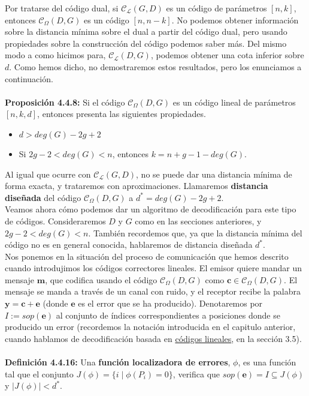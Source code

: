 \documentclass[11pt,spanish]{book}
\begin{document}
Por tratarse del código dual, si $\mathcal{C}_{\mathcal{L}}(G,D)$ es un código de parámetros $[n,k]$, entonces $\mathcal{C}_{\Omega}(D,G)$ es un código $[n, n-k]$. No podemos obtener información sobre la distancia mínima sobre el dual a partir del código dual, pero usando propiedades sobre la construcción del código podemos saber más. Del mismo modo a como hicimos para, $\mathcal{C}_{\mathcal{L}}(D,G)$, podemos obtener una cota inferior sobre $d$. Como hemos dicho, no demostraremos estos resultados, pero los enunciamos a continuación.\\
\\ \hypertarget{prop4.4.8}{\textbf{Proposición 4.4.8:}} Si el código $\mathcal{C}_{\Omega}(D,G)$ es un código lineal de parámetros $[n,k,d]$, entonces presenta las siguientes propiedades.
\begin{itemize}
    \item $d>deg(G)-2g+2$
    \item Si $2g-2<deg(G)<n$, entonces $k=n+g-1-deg(G)$.
\end{itemize}

Al igual que ocurre con $\mathcal{C}_{\mathcal{L}}(G,D)$, no se puede dar una distancia mínima de forma exacta, y trataremos con aproximaciones. Llamaremos \textbf{distancia diseñada} del código $\mathcal{C}_{\Omega}(D,G)$ a $d^{*}=deg(G)-2g+2$.\\

Veamos ahora cómo podemos dar un algoritmo de decodificación para este tipo de códigos. Consideraremos $D$ y $G$ como en las secciones anteriores, y $2g-2<deg(G)<n$. También recordemos que, ya que la distancia mínima del código no es en general conocida, hablaremos de distancia diseñada $d^{*}$.\\

Nos ponemos en la situación del proceso de comunicación que hemos descrito cuando introdujimos los códigos correctores lineales. El emisor quiere mandar un mensaje $\textbf{m}$, que codifica usando el código $\mathcal{C}_{\Omega}(D,G)$ como $\textbf{c}\in\mathcal{C}_{\Omega}(D,G)$. El mensaje se manda a través de un canal con ruido, y el receptor recibe la palabra $\mathbf{y}=\mathbf{c}+\mathbf{e}$ (donde $\mathbf{e}$ es el error que se ha producido). Denotaremos por  $I:=sop(\mathbf{e})$ al conjunto de índices correspondientes a posiciones donde se producido un error (recordemos la notación introducida en el capitulo anterior, cuando hablamos de decodificación basada en \hyperlink{sistemalinealcodigos}{códigos lineales}, en la sección 3.5).\\  \\ \hypertarget{funcionlocalizadoradeerrores}{\textbf{Definición 4.4.16: }} Una \textbf{función localizadora de errores}, $\phi$, es una función tal que el conjunto $J(\phi)=\{i\;|\;\phi (P_{i})=0\}$, verifica que $sop(\mathbf{e})=I\subseteq J(\phi)$ y $|J(\phi)|<d^{*}$.\\
\end{document}
